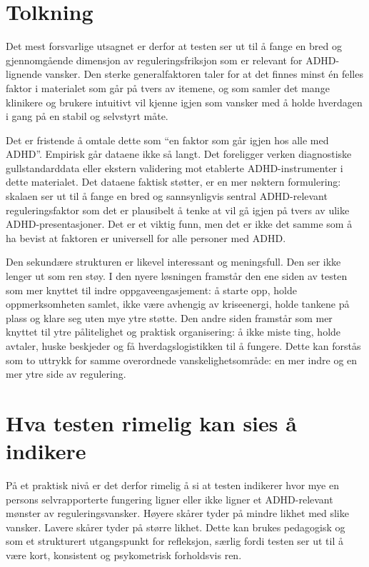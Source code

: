 \documentclass[11pt,a4paper]{article}
\begin{document}
\section{Tolkning}
Det mest forsvarlige utsagnet er derfor at testen ser ut til å fange en bred og gjennomgående dimensjon av reguleringsfriksjon som er relevant for ADHD-lignende vansker. Den sterke generalfaktoren taler for at det finnes minst én felles faktor i materialet som går på tvers av itemene, og som samler det mange klinikere og brukere intuitivt vil kjenne igjen som vansker med å holde hverdagen i gang på en stabil og selvstyrt måte.

Det er fristende å omtale dette som ``en faktor som går igjen hos alle med ADHD''. Empirisk går dataene ikke så langt. Det foreligger verken diagnostiske gullstandarddata eller ekstern validering mot etablerte ADHD-instrumenter i dette materialet. Det dataene faktisk støtter, er en mer nøktern formulering: skalaen ser ut til å fange en bred og sannsynligvis sentral ADHD-relevant reguleringsfaktor som det er plausibelt å tenke at vil gå igjen på tvers av ulike ADHD-presentasjoner. Det er et viktig funn, men det er ikke det samme som å ha bevist at faktoren er universell for alle personer med ADHD.

Den sekundære strukturen er likevel interessant og meningsfull. Den ser ikke lenger ut som ren støy. I den nyere løsningen framstår den ene siden av testen som mer knyttet til indre oppgaveengasjement: å starte opp, holde oppmerksomheten samlet, ikke være avhengig av kriseenergi, holde tankene på plass og klare seg uten mye ytre støtte. Den andre siden framstår som mer knyttet til ytre pålitelighet og praktisk organisering: å ikke miste ting, holde avtaler, huske beskjeder og få hverdagslogistikken til å fungere. Dette kan forstås som to uttrykk for samme overordnede vanskelighetsområde: en mer indre og en mer ytre side av regulering.

\section{Hva testen rimelig kan sies å indikere}
På et praktisk nivå er det derfor rimelig å si at testen indikerer hvor mye en persons selvrapporterte fungering ligner eller ikke ligner et ADHD-relevant mønster av reguleringsvansker. Høyere skårer tyder på mindre likhet med slike vansker. Lavere skårer tyder på større likhet. Dette kan brukes pedagogisk og som et strukturert utgangspunkt for refleksjon, særlig fordi testen ser ut til å være kort, konsistent og psykometrisk forholdsvis ren.
\end{document}
